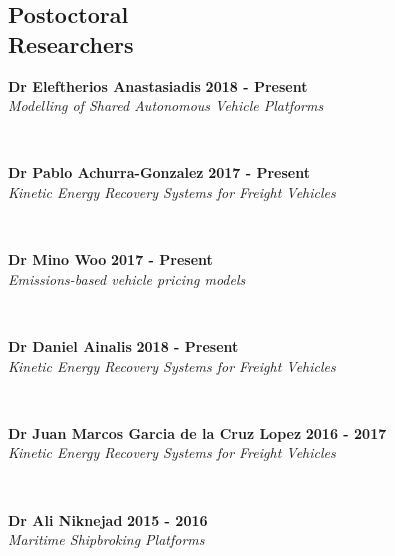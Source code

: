 \documentclass[margin]{res}
\newcommand\tab[1][1cm]{\hspace*{#1}}
\begin{document}
\begin{resume}
\section{\sc Postoctoral\\ Researchers}
	\vspace{0.03in}
	\begin{minipage}{\textwidth}
	{\bf Dr Eleftherios Anastasiadis} \hfill {\bf 2018 - Present} \\
	\tab[0.2in] \textit{Modelling of Shared Autonomous Vehicle Platforms}
	\end{minipage}
	\\
	\vspace{0.03in}
	\begin{minipage}{\textwidth}
	{\bf Dr Pablo Achurra-Gonzalez} \hfill {\bf 2017 - Present} \\
	\tab[0.2in] \textit{Kinetic Energy Recovery Systems for Freight Vehicles}
	\end{minipage}
	\\
	\vspace{0.03in}
	\begin{minipage}{\textwidth}
	{\bf Dr Mino Woo} \hfill {\bf 2017 - Present} \\
	\tab[0.2in] \textit{Emissions-based vehicle pricing models}
	\end{minipage}
	\\
	\vspace{0.03in}
	\begin{minipage}{\textwidth}
	{\bf Dr Daniel Ainalis} \hfill {\bf 2018 - Present} \\
	\tab[0.2in] \textit{Kinetic Energy Recovery Systems for Freight Vehicles}
	\end{minipage}
	\\
	\vspace{0.03in}
	\begin{minipage}{\textwidth}
	{\bf Dr Juan Marcos Garcia de la Cruz Lopez} \hfill {\bf 2016 - 2017} \\
	\tab[0.2in] \textit{Kinetic Energy Recovery Systems for Freight Vehicles}
	\end{minipage}
	\\
	\vspace{0.03in}
	\begin{minipage}{\textwidth}
	{\bf Dr Ali Niknejad} \hfill {\bf 2015 - 2016} \\
	\tab[0.2in] \textit{Maritime Shipbroking Platforms}
	\end{minipage}
	\\

\end{resume}
\end{document}
